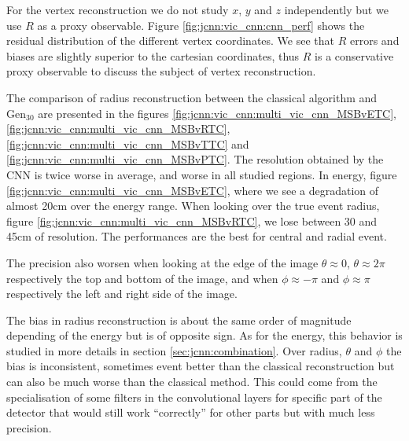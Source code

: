 \documentclass[../main.tex]{subfiles}
\begin{document}
For the vertex reconstruction we do not study $x$, $y$ and $z$ independently but we use $R$ as a proxy observable. Figure \ref{fig:jcnn:vic_cnn:cnn_perf} shows the residual distribution of the different vertex coordinates. We see that $R$ errors and biases are slightly superior to the cartesian coordinates, thus $R$ is a conservative proxy observable to discuss the subject of vertex reconstruction.

The comparison of radius reconstruction between the classical algorithm and $\mathrm{Gen}_{30}$ are presented in the figures \ref{fig:jcnn:vic_cnn:multi_vic_cnn_MSBvETC}, \ref{fig:jcnn:vic_cnn:multi_vic_cnn_MSBvRTC}, \ref{fig:jcnn:vic_cnn:multi_vic_cnn_MSBvTTC} and \ref{fig:jcnn:vic_cnn:multi_vic_cnn_MSBvPTC}. The resolution obtained by the CNN is twice worse in average, and worse in all studied regions.
In energy, figure \ref{fig:jcnn:vic_cnn:multi_vic_cnn_MSBvETC}, where we see a degradation of almost 20cm over the energy range.
When looking over the true event radius, figure \ref{fig:jcnn:vic_cnn:multi_vic_cnn_MSBvRTC}, we lose between 30 and 45cm of resolution. The performances are the best for central and radial event.

The precision also worsen when looking at the edge of the image $\theta \approx 0$, $\theta \approx 2\pi$ respectively the top and bottom of the image, and when $\phi \approx -\pi$ and $\phi \approx \pi$ respectively the left and right side of the image. 

The bias in radius reconstruction is about the same order of magnitude depending of the energy but is of opposite sign. As for the energy, this behavior is studied in more details in section \ref{sec:jcnn:combination}. Over radius, $\theta$ and $\phi$ the bias is inconsistent, sometimes event better than the classical reconstruction but can also be much worse than the classical method. This could come from the specialisation of some filters in the convolutional layers for specific part of the detector that would still work ``correctly'' for other parts but with much less precision.
\end{document}
